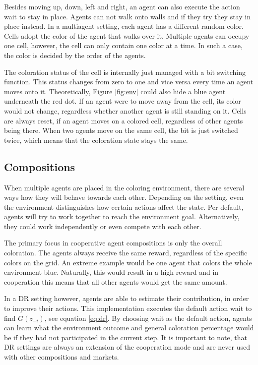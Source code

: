 Besides moving up, down, left and right, an agent can also execute the action wait to stay in place. Agents can not walk onto walls and if they try they stay in place instead. In a multiagent setting, each agent has a different random color. Cells adopt the color of the agent that walks over it. Multiple agents can occupy one cell, however, the cell can only contain one color at a time. In such a case, the color is decided by the order of the agents. 

The coloration status of the cell is internally just managed with a bit switching function. This status changes from zero to one and vice versa every time an agent moves onto it. Theoretically, Figure \ref{fig:env} could also hide a blue agent underneath the red dot. If an agent were to move away from the cell, its color would not change, regardless whether another agent is still standing on it. Cells are always reset, if an agent moves on a colored cell, regardless of other agents being there. When two agents move on the same cell, the bit is just switched twice, which means that the coloration state stays the same.

\subsection{Compositions}

When multiple agents are placed in the coloring environment, there are several ways how they will behave towards each other. Depending on the setting, even the environment distinguishes how certain actions affect the state. Per default, agents will try to work together to reach the environment goal. Alternatively, they could work independently or even compete with each other.

The primary focus in cooperative agent compositions is only the overall coloration. The agents always receive the same reward, regardless of the specific colors on the grid. An extreme example would be one agent that colors the whole environment blue. Naturally, this would result in a high reward and in cooperation this means that all other agents would get the same amount. 

In a DR setting however, agents are able to estimate their contribution, in order to improve their actions. This implementation executes the default action wait to find $G(z_{-i})$, see equation \eqref{eq:dr}. By choosing wait as the default action, agents can learn what the environment outcome and general coloration percentage would be if they had not participated in the current step. It is important to note, that DR settings are always an extension of the cooperation mode and are never used with other compositions and markets.

